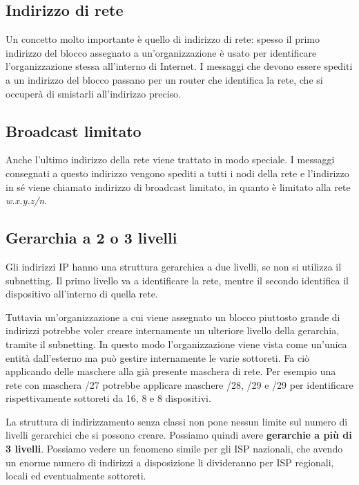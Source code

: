     \subsection{Indirizzo di rete}
        Un concetto molto importante è quello di indirizzo di rete: spesso il primo indirizzo del blocco assegnato a un'organizzazione è usato per identificare l'organizzazione stessa all'interno di Internet. I messaggi che devono essere spediti a un indirizzo del blocco passano per un router che identifica la rete, che si occuperà di smistarli all'indirizzo preciso.
        
    \subsection{Broadcast limitato}
        Anche l'ultimo indirizzo della rete viene trattato in modo speciale. I messaggi consegnati a questo indirizzo vengono spediti a tutti i nodi della rete e l'indirizzo in sé viene chiamato indirizzo di broadcast limitato, in quanto è limitato alla rete \textit{w.x.y.z/n}.
        
    \subsection{Gerarchia a 2 o 3 livelli}
        Gli indirizzi IP hanno una struttura gerarchica a due livelli, se non si utilizza il subnetting. Il primo livello va a identificare la rete, mentre il secondo identifica il dispositivo all'interno di quella rete.
        
        Tuttavia un'organizzazione a cui viene assegnato un blocco piuttosto grande di indirizzi potrebbe voler creare internamente un ulteriore livello della gerarchia, tramite il subnetting. In questo modo l'organizzazione viene vista come un'unica entità dall'esterno ma può gestire internamente le varie sottoreti. Fa ciò applicando delle maschere alla già presente maschera di rete. Per esempio una rete con maschera /27 potrebbe applicare maschere /28, /29 e /29 per identificare rispettivamente sottoreti da 16, 8 e 8 dispositivi.
        
        La struttura di indirizzamento senza classi non pone nessun limite sul numero di livelli gerarchici che si possono creare. Possiamo quindi avere \textbf{gerarchie a più di 3 livelli}. Possiamo vedere un fenomeno simile per gli ISP nazionali, che avendo un enorme numero di indirizzi a disposizione li divideranno per ISP regionali, locali ed eventualmente sottoreti.
        
